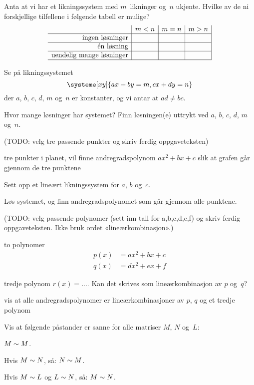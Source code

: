 \begin{oppgave}
Anta at vi har et likningssystem med $m$~likninger og~$n$ ukjente.
Hvilke av de ni forskjellige tilfellene i følgende tabell er mulige?
\[
\begin{array}{r|c|c|c|}
                                & m < n & m = n & m > n \\ \hline
\text{ingen løsninger}          &       &       &       \\ \hline
\text{én løsning}               &       &       &       \\ \hline
\text{uendelig mange løsninger} &       &       &       \\ \hline
\end{array}
\]
\end{oppgave}


\begin{oppgave}
Se på likningssystemet
\[
\systeme[xy]{
  ax + by = m,
  cx + dy = n
}
\]
der $a$, $b$, $c$, $d$, $m$ og~$n$ er konstanter, og vi antar at $ad \ne bc$.

Hvor mange løsninger har systemet?  Finn løsningen(e) uttrykt ved $a$,
$b$, $c$, $d$, $m$ og~$n$.
\end{oppgave}


\begin{oppgave}
(TODO: velg tre passende punkter og skriv ferdig oppgaveteksten)

tre punkter i planet, vil finne andregradspolynom $ax^2 + bx + c$ slik
at grafen går gjennom de tre punktene
\begin{punkt}
Sett opp et lineært likningssystem for $a$, $b$ og~$c$.
\end{punkt}
\begin{punkt}
Løs systemet, og finn andregradspolynomet som går gjennom alle punktene.
\end{punkt}
\end{oppgave}


\begin{oppgave}
(TODO: velg passende polynomer (sett inn tall for a,b,c,d,e,f)
og skriv ferdig oppgaveteksten.  Ikke bruk ordet «lineærkombinasjon».)

to polynomer
\begin{align*}
p(x) &= ax^2 + bx + c \\
q(x) &= dx^2 + ex + f
\end{align*}

tredje polynom $r(x) = ...$.  Kan det skrives som lineærkombinasjon av $p$ og~$q$?

vis at alle andregradspolynomer er lineærkombinasjoner av $p$, $q$ og et tredje polynom
\end{oppgave}


\begin{oppgave}
Vis at følgende påstander er sanne for alle matriser $M$, $N$ og~$L$:
\begin{punkt}
$M \sim M$.
\end{punkt}
\begin{punkt}
Hvis $M \sim N$, så: $N \sim M$.
\end{punkt}
\begin{punkt}
Hvis $M \sim L$ og $L \sim N$, så: $M \sim N$.
\end{punkt}
\end{oppgave}
